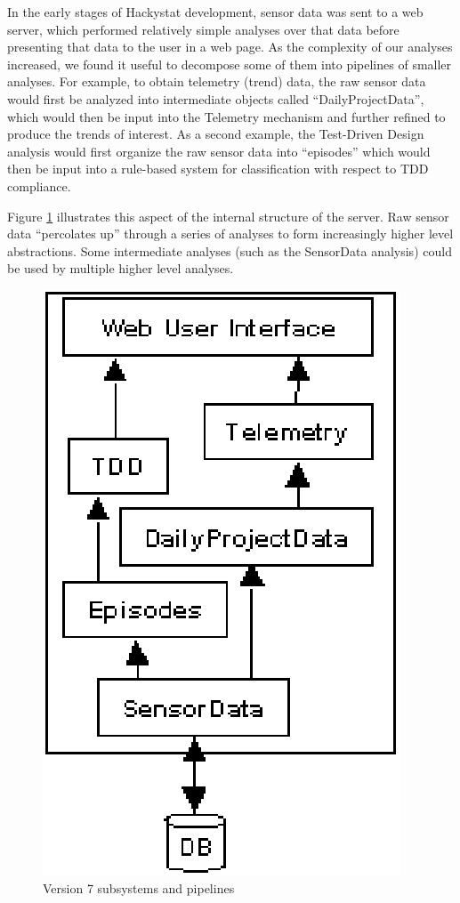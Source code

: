 \documentclass[conference,compsoc,peerreview]{IEEEtran}
\begin{document}
In the early stages of Hackystat development, sensor data was sent to a web
server, which performed relatively simple analyses over that data before
presenting that data to the user in a web page.  As the complexity of our
analyses increased, we found it useful to decompose some of them into
pipelines of smaller analyses.  For example, to obtain telemetry (trend)
data, the raw sensor data would first be analyzed into intermediate objects
called ``DailyProjectData'', which would then be input into the Telemetry
mechanism and further refined to produce the trends of interest.  As a
second example, the Test-Driven Design analysis would first organize the
raw sensor data into ``episodes'' which would then be input into a
rule-based system for classification with respect to TDD compliance.

Figure \ref{fig:subsystems} illustrates this aspect of the internal structure
of the server.  Raw sensor data ``percolates up'' through a series of analyses
to form increasingly higher level abstractions.  Some intermediate analyses 
(such as the SensorData analysis) could be used by multiple higher level analyses.

\begin{figure}[ht]
  \center
  \includegraphics{subsystems.eps}
  \caption{Version 7 subsystems and pipelines}
  \label{fig:subsystems}
\end{figure} 
\end{document}
